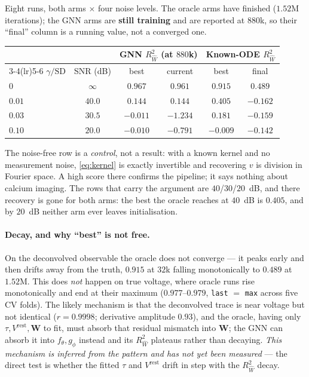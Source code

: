 \documentclass[10pt]{article}
\newcommand{\Rw}{R^2_{\widehat W}}
\newcommand{\Mat}[1]{\mathbf{#1}}
\begin{document}
Eight runs, both arms $\times$ four noise levels. The oracle arms have finished
($1.52$M iterations); the GNN arms are \textbf{still training} and are reported at
$880$k, so their ``final'' column is a running value, not a converged one.

\begin{center}
{\footnotesize
\begin{tabular}{lccccc}
\toprule
& & \multicolumn{2}{c}{GNN $\Rw$ (at $880$k)} & \multicolumn{2}{c}{Known-ODE $\Rw$} \\
\cmidrule(lr){3-4}\cmidrule(lr){5-6}
$\gamma/\mathrm{SD}$ & SNR (dB) & best & current & best & final \\
\midrule
$0$    & $\infty$ & $0.967$  & $0.961$  & $0.915$  & $0.489$ \\
$0.01$ & $40.0$   & $0.144$  & $0.144$  & $0.405$  & $-0.162$ \\
$0.03$ & $30.5$   & $-0.011$ & $-1.234$ & $0.181$  & $-0.159$ \\
$0.10$ & $20.0$   & $-0.010$ & $-0.791$ & $-0.009$ & $-0.142$ \\
\bottomrule
\end{tabular}}
\end{center}

The noise-free row is a \emph{control}, not a result: with a known kernel and no
measurement noise, \eqref{eq:kernel} is exactly invertible and recovering $v$ is
division in Fourier space. A high score there confirms the pipeline; it says
nothing about calcium imaging. The rows that carry the argument are $40$/$30$/$20$~dB,
and there recovery is gone for both arms: the best the oracle reaches at $40$~dB is
$0.405$, and by $20$~dB neither arm ever leaves initialisation.

\paragraph{Decay, and why ``best'' is not free.} On the deconvolved observable the
oracle does not converge --- it peaks early and then drifts away from the truth,
$0.915$ at $32$k falling monotonically to $0.489$ at $1.52$M. This does \emph{not}
happen on true voltage, where oracle runs rise monotonically and end at their
maximum ($0.977$--$0.979$, \texttt{last} $=$ \texttt{max} across five CV folds). The
likely mechanism is that the deconvolved trace is near voltage but not identical
($r = 0.9998$; derivative amplitude $0.93$), and the oracle, having only
$\tau, V^{\mathrm{rest}}, \Mat{W}$ to fit, must absorb that residual mismatch into
$\Mat{W}$; the GNN can absorb it into $f_\theta, g_\phi$ instead and its $\Rw$
plateaus rather than decaying. \emph{This mechanism is inferred from the pattern
and has not yet been measured} --- the direct test is whether the fitted $\tau$ and
$V^{\mathrm{rest}}$ drift in step with the $\Rw$ decay.
\end{document}
